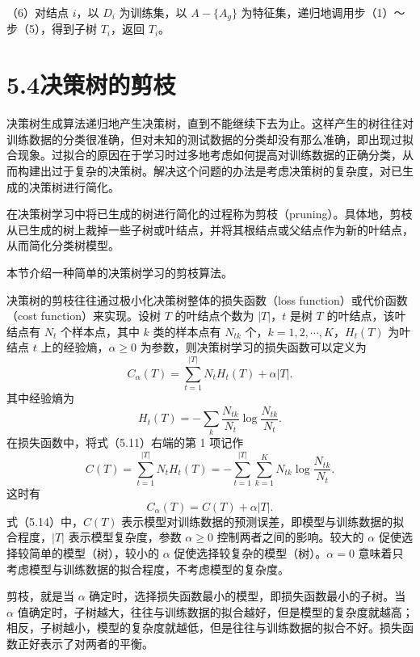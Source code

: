 \documentclass[UTF8, 12pt, fontset=fandol, oneside]{ctexart}
\begin{document}
（6）对结点 $i$，以 $D_i$ 为训练集，以 $A-\{A_g\}$ 为特征集，递归地调用步（1）～步（5），得到子树 $T_i$，返回 $T_i$。

\section*{5.4\quad 决策树的剪枝}

决策树生成算法递归地产生决策树，直到不能继续下去为止。这样产生的树往往对训练数据的分类很准确，但对未知的测试数据的分类却没有那么准确，即出现过拟合现象。过拟合的原因在于学习时过多地考虑如何提高对训练数据的正确分类，从而构建出过于复杂的决策树。解决这个问题的办法是考虑决策树的复杂度，对已生成的决策树进行简化。

在决策树学习中将已生成的树进行简化的过程称为剪枝（pruning）。具体地，剪枝从已生成的树上裁掉一些子树或叶结点，并将其根结点或父结点作为新的叶结点，从而简化分类树模型。

本节介绍一种简单的决策树学习的剪枝算法。

决策树的剪枝往往通过极小化决策树整体的损失函数（loss function）或代价函数（cost function）来实现。设树 $T$ 的叶结点个数为 $|T|$，$t$ 是树 $T$ 的叶结点，该叶结点有 $N_t$ 个样本点，其中 $k$ 类的样本点有 $N_{tk}$ 个，$k=1,2,\cdots,K$，$H_t(T)$ 为叶结点 $t$ 上的经验熵，$\alpha\ge0$ 为参数，则决策树学习的损失函数可以定义为
\begin{equation}
  C_\alpha(T)=\sum_{t=1}^{|T|}N_tH_t(T)+\alpha|T|.
  \tag{5.11}
\end{equation}
其中经验熵为
\begin{equation}
  H_t(T)=-\sum_k\frac{N_{tk}}{N_t}\log\frac{N_{tk}}{N_t}.
  \tag{5.12}
\end{equation}
在损失函数中，将式（5.11）右端的第 1 项记作
\begin{equation}
  C(T)=\sum_{t=1}^{|T|}N_tH_t(T)
  =-\sum_{t=1}^{|T|}\sum_{k=1}^{K}N_{tk}\log\frac{N_{tk}}{N_t}.
  \tag{5.13}
\end{equation}
这时有
\begin{equation}
  C_\alpha(T)=C(T)+\alpha|T|.
  \tag{5.14}
\end{equation}
式（5.14）中，$C(T)$ 表示模型对训练数据的预测误差，即模型与训练数据的拟合程度，$|T|$ 表示模型复杂度，参数 $\alpha\ge0$ 控制两者之间的影响。较大的 $\alpha$ 促使选择较简单的模型（树），较小的 $\alpha$ 促使选择较复杂的模型（树）。$\alpha=0$ 意味着只考虑模型与训练数据的拟合程度，不考虑模型的复杂度。

剪枝，就是当 $\alpha$ 确定时，选择损失函数最小的模型，即损失函数最小的子树。当 $\alpha$ 值确定时，子树越大，往往与训练数据的拟合越好，但是模型的复杂度就越高；相反，子树越小，模型的复杂度就越低，但是往往与训练数据的拟合不好。损失函数正好表示了对两者的平衡。
\end{document}
